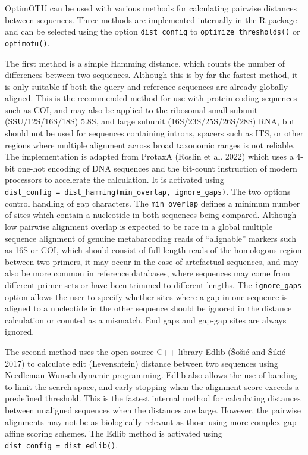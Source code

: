 \documentclass[
]{article}
\begin{document}
OptimOTU can be used with various methods for calculating pairwise distances between sequences.
Three methods are implemented internally in the R package and can be selected using the option \texttt{dist\_config} to \texttt{optimize\_thresholds()} or \texttt{optimotu()}.

The first method is a simple Hamming distance, which counts the number of differences between two sequences.
Although this is by far the fastest method, it is only suitable if both the query and reference sequences are already globally aligned.
This is the recommended method for use with protein-coding sequences such as COI, and may also be applied to the ribosomal small subunit (SSU/12S/16S/18S) 5.8S, and large subunit (16S/23S/25S/26S/28S) RNA, but should not be used for sequences containing introns, spacers such as ITS, or other regions where multiple alignment across broad taxonomic ranges is not reliable.
The implementation is adapted from ProtaxA (Roslin et al. 2022) which uses a 4-bit one-hot encoding of DNA sequences and the bit-count instruction of modern processors to accelerate the calculation.
It is activated using \texttt{dist\_config\ =\ dist\_hamming(min\_overlap,\ ignore\_gaps)}.
The two options control handling of gap characters.
The \texttt{min\_overlap} defines a minimum number of sites which contain a nucleotide in both sequences being compared.
Although low pairwise alignment overlap is expected to be rare in a global multiple sequence alignment of genuine metabarcoding reads of ``alignable'' markers such as 16S or COI, which should consist of full-length reads of the homologous region between two primers, it may occur in the case of artefactual sequences, and may also be more common in reference databases, where sequences may come from different primer sets or have been trimmed to different lengths.
The \texttt{ignore\_gaps} option allows the user to specify whether sites where a gap in one sequence is aligned to a nucleotide in the other sequence should be ignored in the distance calculation or counted as a mismatch.
End gaps and gap-gap sites are always ignored.

The second method uses the open-source C++ library Edlib (Šošić and Šikić 2017) to calculate edit (Levenshtein) distance between two sequences using Needleman-Wunsch dynamic programming.
Edlib also allows the use of banding to limit the search space, and early stopping when the alignment score exceeds a predefined threshold.
This is the fastest internal method for calculating distances between unaligned sequences when the distances are large.
However, the pairwise alignments may not be as biologically relevant as those using more complex gap-affine scoring schemes.
The Edlib method is activated using \texttt{dist\_config\ =\ dist\_edlib()}.
\end{document}

